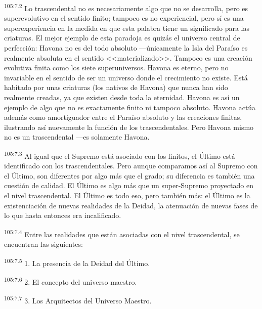 \documentclass[twoside, 11pt]{book}
\begin{document}
\par
\textsuperscript{105:7.2} Lo trascendental no es necesariamente algo que no se desarrolla, pero es superevolutivo en el sentido finito; tampoco es no experiencial, pero sí es una superexperiencia en la medida en que esta palabra tiene un significado para las criaturas. El mejor ejemplo de esta paradoja es quizás el universo central de perfección: Havona no es del todo absoluto ---únicamente la Isla del Paraíso es realmente absoluta en el sentido <<materializado>>. Tampoco es una creación evolutiva finita como los siete superuniversos. Havona es eterno, pero no invariable en el sentido de ser un universo donde el crecimiento no existe. Está habitado por unas criaturas (los nativos de Havona) que nunca han sido realmente creadas, ya que existen desde toda la eternidad. Havona es así un ejemplo de algo que no es exactamente finito ni tampoco absoluto. Havona actúa además como amortiguador entre el Paraíso absoluto y las creaciones finitas, ilustrando así nuevamente la función de los trascendentales. Pero Havona mismo no es un trascendental ---es solamente Havona.

\par
\textsuperscript{105:7.3} Al igual que el Supremo está asociado con los finitos, el
Último está identificado con los trascendentales. Pero aunque comparamos así al Supremo con el Último, son diferentes por algo más que el grado; su diferencia es también una cuestión de calidad. El Último es algo más que un super-Supremo proyectado en el nivel trascendental. El Último es todo eso, pero también más: el Último es la existenciación de nuevas realidades de la Deidad, la atenuación de nuevas fases de lo que hasta entonces era incalificado.

\par
\textsuperscript{105:7.4} Entre las realidades que están asociadas con el nivel trascendental, se encuentran las siguientes:

\par
\textsuperscript{105:7.5} 1. La presencia de la Deidad del Último.

\par
\textsuperscript{105:7.6} 2. El concepto del universo maestro.

\par
\textsuperscript{105:7.7} 3. Los Arquitectos del Universo Maestro.
\end{document}
